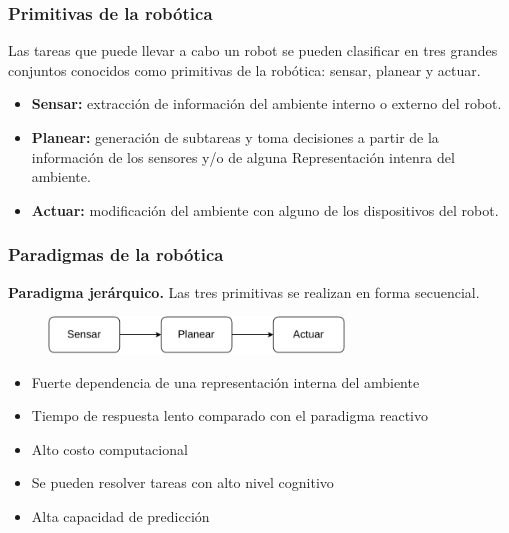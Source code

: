 \documentclass[10pt,spanish,aspectratio=1610]{beamer}
\begin{document}
\begin{frame}\frametitle{Primitivas de la robótica}
Las tareas que puede llevar a cabo un robot se pueden clasificar en tres grandes conjuntos conocidos como primitivas de la robótica: sensar, planear y actuar.
  \begin{itemize}
  \item \textbf{Sensar: } extracción de información del ambiente interno o externo del robot.
  \item \textbf{Planear: } generación de subtareas y toma decisiones a partir de la información de los sensores y/o de alguna Representación intenra del ambiente.
  \item \textbf{Actuar: } modificación del ambiente con alguno de los dispositivos del robot. 
  \end{itemize}
\end{frame}

\begin{frame}\frametitle{Paradigmas de la robótica}
  \textbf{Paradigma jerárquico.} Las tres primitivas se realizan en forma secuencial.
  \begin{figure}
    \centering
    \includegraphics[width=0.7\textwidth]{Figures/ParadigmHierarchical.pdf}
  \end{figure}
  \begin{itemize}
  \item Fuerte dependencia de una representación interna del ambiente
  \item Tiempo de respuesta lento comparado con el paradigma reactivo
  \item Alto costo computacional
  \item Se pueden resolver tareas con alto nivel cognitivo
  \item Alta capacidad de predicción
  \end{itemize}
\end{frame}
\end{document}
